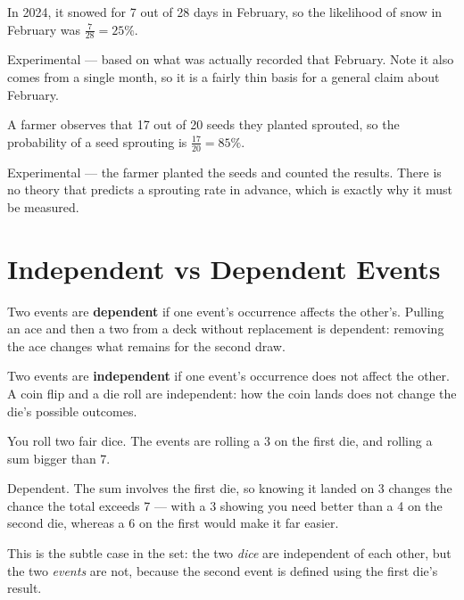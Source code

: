 \documentclass[12pt]{ximera}
\begin{document}
\begin{problem}
In 2024, it snowed for 7 out of 28 days in February, so the likelihood of snow in February
was $\frac{7}{28} = 25\%$.
\begin{multipleChoice}
\end{multipleChoice}

\begin{solution}
Experimental --- based on what was actually recorded that February. Note it also comes
from a single month, so it is a fairly thin basis for a general claim about February.
\end{solution}
\end{problem}

\begin{problem}
A farmer observes that 17 out of 20 seeds they planted sprouted, so the probability of a
seed sprouting is $\frac{17}{20} = 85\%$.
\begin{multipleChoice}
\end{multipleChoice}

\begin{solution}
Experimental --- the farmer planted the seeds and counted the results. There is no theory
that predicts a sprouting rate in advance, which is exactly why it must be measured.
\end{solution}
\end{problem}

\section*{Independent vs Dependent Events}

Two events are \textbf{dependent} if one event's occurrence affects the other's. Pulling
an ace and then a two from a deck without replacement is dependent: removing the ace
changes what remains for the second draw.

Two events are \textbf{independent} if one event's occurrence does not affect the other. A
coin flip and a die roll are independent: how the coin lands does not change the die's
possible outcomes.

\begin{problem}
You roll two fair dice. The events are rolling a 3 on the first die, and rolling a sum
bigger than 7.
\begin{multipleChoice}
\end{multipleChoice}

\begin{solution}
Dependent. The sum involves the first die, so knowing it landed on 3 changes the chance
the total exceeds 7 --- with a 3 showing you need better than a 4 on the second die,
whereas a 6 on the first would make it far easier.

This is the subtle case in the set: the two \emph{dice} are independent of each other, but
the two \emph{events} are not, because the second event is defined using the first die's
result.
\end{solution}
\end{problem}
\end{document}
